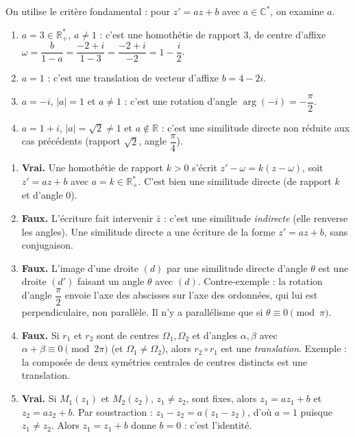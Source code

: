 \documentclass[11pt]{article}
\newcommand{\cle}[1]{{\popxbold\color{popdark}#1}}
\begin{document}
\begin{corrige}
On utilise le critère fondamental : pour $z' = az + b$ avec $a \in \mathbb{C}^*$, on examine $a$.
\begin{enumerate}
\item $a = 3 \in \mathbb{R}^*_+$, $a \neq 1$ : c'est une \cle{homothétie} de rapport $3$, de centre d'affixe $\omega = \dfrac{b}{1-a} = \dfrac{-2+i}{1-3} = \dfrac{-2+i}{-2} = 1 - \dfrac{i}{2}$.
\item $a = 1$ : c'est une \cle{translation} de vecteur d'affixe $b = 4 - 2i$.
\item $a = -i$, $|a| = 1$ et $a \neq 1$ : c'est une \cle{rotation} d'angle $\arg(-i) = -\dfrac{\pi}{2}$.
\item $a = 1+i$, $|a| = \sqrt{2} \neq 1$ et $a \notin \mathbb{R}$ : c'est une \cle{similitude directe} non réduite aux cas précédents (rapport $\sqrt{2}$, angle $\dfrac{\pi}{4}$).
\end{enumerate}
\end{corrige}

\begin{corrige}
\begin{enumerate}
\item \textbf{Vrai.} Une homothétie de rapport $k > 0$ s'écrit $z' - \omega = k(z - \omega)$, soit $z' = az + b$ avec $a = k \in \mathbb{R}^*_+$. C'est bien une similitude directe (de rapport $k$ et d'angle $0$).
\item \textbf{Faux.} L'écriture fait intervenir $\bar{z}$ : c'est une similitude \emph{indirecte} (elle renverse les angles). Une similitude directe a une écriture de la forme $z' = az + b$, sans conjugaison.
\item \textbf{Faux.} L'image d'une droite $(d)$ par une similitude directe d'angle $\theta$ est une droite $(d')$ faisant un angle $\theta$ avec $(d)$. Contre-exemple : la rotation d'angle $\dfrac{\pi}{2}$ envoie l'axe des abscisses sur l'axe des ordonnées, qui lui est perpendiculaire, non parallèle. Il n'y a parallélisme que si $\theta \equiv 0 \pmod{\pi}$.
\item \textbf{Faux.} Si $r_1$ et $r_2$ sont de centres $\Omega_1, \Omega_2$ et d'angles $\alpha, \beta$ avec $\alpha + \beta \equiv 0 \pmod{2\pi}$ (et $\Omega_1 \neq \Omega_2$), alors $r_2 \circ r_1$ est une \emph{translation}. Exemple : la composée de deux symétries centrales de centres distincts est une translation.
\item \textbf{Vrai.} Si $M_1(z_1)$ et $M_2(z_2)$, $z_1 \neq z_2$, sont fixes, alors $z_1 = az_1 + b$ et $z_2 = az_2 + b$. Par soustraction : $z_1 - z_2 = a(z_1 - z_2)$, d'où $a = 1$ puisque $z_1 \neq z_2$. Alors $z_1 = z_1 + b$ donne $b = 0$ : c'est l'identité.
\end{enumerate}
\end{corrige}
\end{document}
